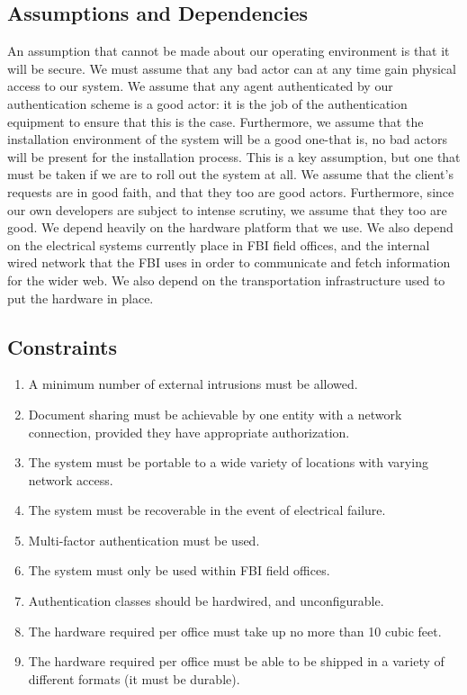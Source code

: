 \documentclass[12pt]{article}
\begin{document}
\subsection{Assumptions and Dependencies}

An assumption that cannot be made about our operating environment is that it will be secure. We must assume that
any bad actor can at any time gain physical access to our system. We assume that any agent authenticated by our
authentication scheme is a good actor: it is the job of the authentication equipment to ensure that this is the case.
Furthermore, we assume that the installation environment of the system will be a good one-that is, no bad actors will
be present for the installation process. This is a key assumption, but one that must be taken if we are to roll out
the system at all. We assume that the client’s requests are in good faith, and that they too are good actors. Furthermore,
since our own developers are subject to intense scrutiny, we assume that they too are good. We depend heavily on the
hardware platform that we use. We also depend on the electrical systems currently place in FBI field offices, and the
internal wired network that the FBI uses in order to communicate and fetch information for the wider web. We also
depend on the transportation infrastructure used to put the hardware in place.

\subsection{Constraints}

\begin{enumerate}
    \item A minimum number of external intrusions must be allowed.
    \item Document sharing must be achievable by one entity with a network connection, provided they have appropriate
    authorization.
    \item The system must be portable to a wide variety of locations with varying network access.
    \item The system must be recoverable in the event of electrical failure.
    \item Multi-factor authentication must be used.
    \item The system must only be used within FBI field offices.
    \item Authentication classes should be hardwired, and unconfigurable.
    \item The hardware required per office must take up no more than 10 cubic feet.
    \item The hardware required per office must be able to be shipped in a variety of different formats (it must be durable).
\end{enumerate}
\end{document}
